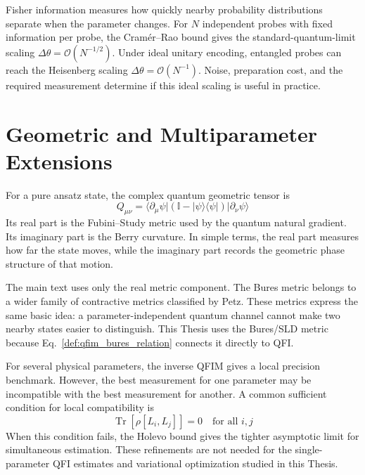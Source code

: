 \begin{remark}
    Fisher information measures how quickly nearby probability distributions separate when the parameter changes.  For $N$ independent probes with fixed information per probe, the Cram\'er--Rao bound gives the standard-quantum-limit scaling $\Delta\theta=\mathcal{O}(N^{-1/2})$.  Under ideal unitary encoding, entangled probes can reach the Heisenberg scaling $\Delta\theta=\mathcal{O}(N^{-1})$.  Noise, preparation cost, and the required measurement determine if this ideal scaling is useful in practice.
\end{remark}

\section{Geometric and Multiparameter Extensions}

\begin{definition}
    For a pure ansatz state, the complex quantum geometric tensor is
    \begin{equation}
        Q_{\mu\nu}
        =\langle\partial_\mu\psi|
        (\mathbb{I}-|\psi\rangle\langle\psi|)
        |\partial_\nu\psi\rangle
        \label{eq:qgt_def}
    \end{equation}
    Its real part is the Fubini--Study metric used by the quantum natural gradient.  Its imaginary part is the Berry curvature.  In simple terms, the real part measures how far the state moves, while the imaginary part records the geometric phase structure of that motion.
\end{definition}

\begin{remark}
    The main text uses only the real metric component.  The Bures metric belongs to a wider family of contractive metrics classified by Petz.  These metrics express the same basic idea: a parameter-independent quantum channel cannot make two nearby states easier to distinguish.  This Thesis uses the Bures/SLD metric because Eq.~\eqref{def:qfim_bures_relation} connects it directly to QFI.
\end{remark}

\begin{remark}
    For several physical parameters, the inverse QFIM gives a local precision benchmark.  However, the best measurement for one parameter may be incompatible with the best measurement for another.  A common sufficient condition for local compatibility is
    \begin{equation}
        \operatorname{Tr}\!\left[\rho[L_i,L_j]\right]=0
        \quad\text{for all } i,j
        \label{eq:weak_commutativity}
    \end{equation}
    When this condition fails, the Holevo bound gives the tighter asymptotic limit for simultaneous estimation.  These refinements are not needed for the single-parameter QFI estimates and variational optimization studied in this Thesis.
\end{remark}

